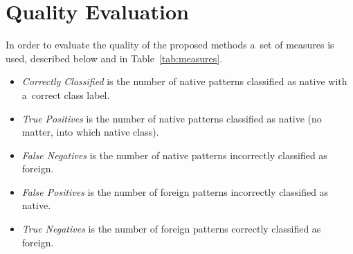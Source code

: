 \chapter{Quality Evaluation} \label{quality_measures}

In order to evaluate the quality of the proposed methods a~set of measures is used, described below and in Table~\ref{tab:measures}.
\begin{itemize}
	\item \emph{Correctly Classified} is the number of native patterns classified as native with a~correct class label.
	\item \emph{True Positives} is the number of native patterns classified as native (no matter, into which native class).
	\item \emph{False Negatives} is the number of native patterns incorrectly classified as foreign.
	\item \emph{False Positives} is the number of foreign patterns incorrectly classified as native.
	\item \emph{True Negatives} is the number of foreign patterns correctly classified as foreign.
\end{itemize}  


